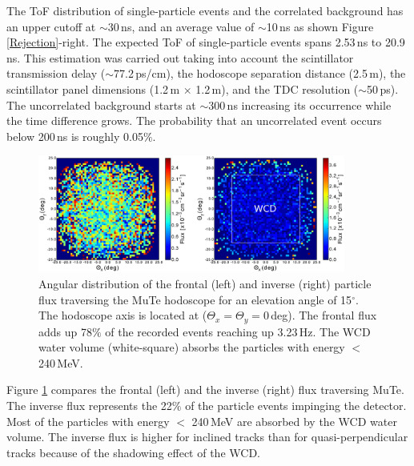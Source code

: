 \documentclass{PoS}
\begin{document}
The ToF distribution of single-particle events and the correlated background has an upper cutoff at $\sim$30\,ns, and an average value of $\sim$10\,ns as shown Figure \ref{Rejection}-right. The expected ToF of single-particle events spans 2.53\,ns to 20.9\,ns. This estimation was carried out taking into account the scintillator transmission delay ($\sim$77.2\,ps/cm), the hodoscope separation distance (2.5\,m), the scintillator panel dimensions (1.2\,m $\times$ 1.2\,m), and the TDC resolution ($\sim$50\,ps). The uncorrelated background starts at $\sim$300\,ns increasing its occurrence while the time difference grows. The probability that an uncorrelated event occurs below 200\,ns is roughly 0.05$\%$.

\begin{figure}[!h]
\begin{center}
\includegraphics[width=0.9\textwidth]{Figures/Back_forward_flux_10d.eps}
\caption{Angular distribution of the frontal (left) and inverse (right) particle flux traversing the MuTe hodoscope for an elevation angle of 15$^{\circ}$. The hodoscope axis is located at ($\Theta_x = \Theta_y = 0$\,deg). The frontal flux adds up 78$\%$ of the recorded events reaching up 3.23\,Hz. The WCD water volume (white-square) absorbs the particles with energy $<$ 240\,MeV.}
\label{Backflux}
\end{center}
\end{figure}

Figure \ref{Backflux} compares the frontal (left) and the inverse (right) flux traversing MuTe. The inverse flux represents the 22$\%$ of the particle events impinging the detector. Most of the particles with energy $<$ 240\,MeV are absorbed by the WCD water volume. The inverse flux is higher for inclined tracks than for quasi-perpendicular tracks because of the shadowing effect of the WCD.
\end{document}
